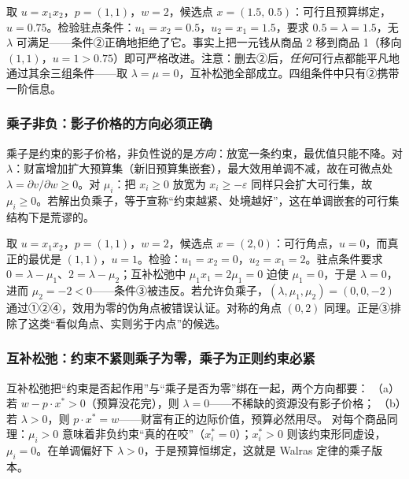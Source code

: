 \begin{example}
\label{ex:no-stat}
取 $u=x_1x_2$，$p=(1,1)$，$w=2$，候选点 $x=(1.5,\,0.5)$：可行且预算绑定，$u=0.75$。检验驻点条件：$u_1=x_2=0.5$，$u_2=x_1=1.5$，要求 $0.5=\lambda=1.5$，无 $\lambda$ 可满足——条件②正确地拒绝了它。事实上把一元钱从商品 2 移到商品 1（移向 $(1,1)$，$u=1>0.75$）即可严格改进。注意：删去②后，\emph{任何}可行点都能平凡地通过其余三组条件——取 $\lambda=\mu=0$，互补松弛全部成立。四组条件中只有②携带一阶信息。
\end{example}

\subsubsection{乘子非负：影子价格的方向必须正确}

乘子是约束的影子价格，非负性说的是\emph{方向}：放宽一条约束，最优值只能不降。对 $\lambda$：财富增加扩大预算集（新旧预算集嵌套），最大效用单调不减，故在可微点处 $\lambda=\partial v/\partial w\ge 0$。对 $\mu_i$：把 $x_i\ge 0$ 放宽为 $x_i\ge-\varepsilon$ 同样只会扩大可行集，故 $\mu_i\ge 0$。若解出负乘子，等于宣称“约束越紧、处境越好”，这在单调嵌套的可行集结构下是荒谬的。

\begin{example}
\label{ex:no-sign}
取 $u=x_1x_2$，$p=(1,1)$，$w=2$，候选点 $x=(2,0)$：可行角点，$u=0$，而真正的最优是 $(1,1)$，$u=1$。检验：$u_1=x_2=0$，$u_2=x_1=2$。驻点条件要求 $0=\lambda-\mu_1$、$2=\lambda-\mu_2$；互补松弛中 $\mu_1x_1=2\mu_1=0$ 迫使 $\mu_1=0$，于是 $\lambda=0$，进而 $\mu_2=-2<0$——条件③被违反。若允许负乘子，$(\lambda,\mu_1,\mu_2)=(0,0,-2)$ 通过①②④，效用为零的伪角点被错误认证。对称的角点 $(0,2)$ 同理。正是③排除了这类“看似角点、实则劣于内点”的候选。
\end{example}

\subsubsection{互补松弛：约束不紧则乘子为零，乘子为正则约束必紧}

互补松弛把“约束是否起作用”与“乘子是否为零”绑在一起，两个方向都要：
（a）若 $w-p\cdot x^*>0$（预算没花完），则 $\lambda=0$——不稀缺的资源没有影子价格；
（b）若 $\lambda>0$，则 $p\cdot x^*=w$——财富有正的边际价值，预算必然用尽。
对每个商品同理：$\mu_i>0$ 意味着非负约束“真的在咬”（$x_i^*=0$）；$x_i^*>0$ 则该约束形同虚设，$\mu_i=0$。在单调偏好下 $\lambda>0$，于是预算恒绑定，这就是 Walras 定律的乘子版本。

